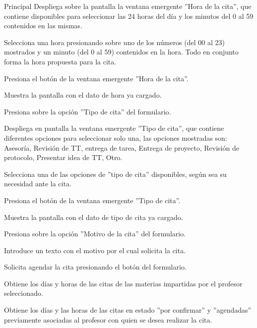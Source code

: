 \begin{UCtrayectoria}{Principal}
	\UCpaso Despliega sobre la pantalla la ventana emergente ''Hora de la cita'', que contiene disponibles para seleccionar las 24 horas del día y los minutos del 0 al 59 contenidos en las mismas.

	\UCpaso [\UCactor] Selecciona una hora presionando sobre uno de los números (del 00 al 23) mostrados y un minuto (del 0 al 59) contenidos en la hora. Todo en conjunto forma la hora propuesta para la cita.

	\UCpaso [\UCactor] Presiona el botón  de la ventana emergente ''Hora de la cita''. 

	\UCpaso Muestra la pantalla  con el dato de hora ya cargado.

	\UCpaso [\UCactor] Presiona sobre la opción ''Tipo de cita'' del formulario. \label{l_EM_Citas_CU2_tipoCita} 

	\UCpaso Despliega en pantalla la ventana emergente ''Tipo de cita'', que contiene diferentes opciones para seleccionar solo una, las opciones mostradas son: Asesoría, Revisión de TT, entrega de tarea, Entrega de proyecto, Revisión de protocolo, Presentar idea de TT, Otro.

	\UCpaso [\UCactor] Selecciona una de las opciones de ''tipo de cita'' disponibles, según sea su necesidad ante la cita.

	\UCpaso [\UCactor] Presiona el botón  de la ventana emergente ''Tipo de cita''. 

	\UCpaso Muestra la pantalla  con el dato de tipo de cita ya cargado.

	\UCpaso [\UCactor] Presiona sobre la opción ''Motivo de la cita'' del formulario.

	\UCpaso [\UCactor] Introduce un texto con el motivo por el cual solicita la cita.

	\UCpaso [\UCactor] Solicita agendar la cita presionando el botón  del formulario.

	\UCpaso Obtiene los días y horas de las citas de las materias impartidas por el profesor seleccionado.

	\UCpaso Obtiene los días y las horas de las citas en estado ''por confirmar'' y ''agendadas'' previamente asociadas al profesor con quien se desea realizar la cita.


\end{UCtrayectoria}
